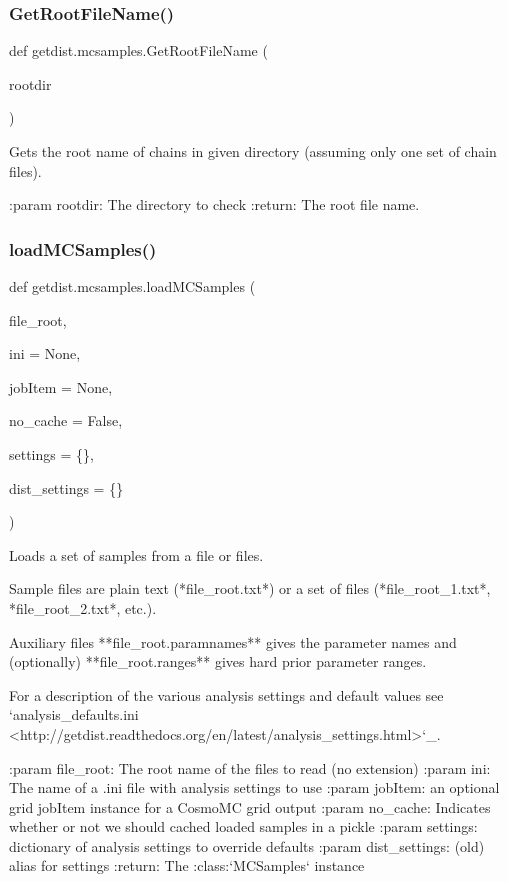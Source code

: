 \subsubsection{\texorpdfstring{Get\+Root\+File\+Name()}{GetRootFileName()}}
{\footnotesize\ttfamily def getdist.\+mcsamples.\+Get\+Root\+File\+Name (\begin{DoxyParamCaption}\item[{}]{rootdir }\end{DoxyParamCaption})}

\begin{DoxyVerb}Gets the root name of chains in given directory (assuming only one set of chain files).

:param rootdir: The directory to check
:return: The root file name.
\end{DoxyVerb}
 \mbox{\label{namespacegetdist_1_1mcsamples_a66a8bc2e3ca8236e828441cbf5db2cba}} 
\subsubsection{\texorpdfstring{load\+M\+C\+Samples()}{loadMCSamples()}}
{\footnotesize\ttfamily def getdist.\+mcsamples.\+load\+M\+C\+Samples (\begin{DoxyParamCaption}\item[{}]{file\+\_\+root,  }\item[{}]{ini = {\ttfamily None},  }\item[{}]{job\+Item = {\ttfamily None},  }\item[{}]{no\+\_\+cache = {\ttfamily False},  }\item[{}]{settings = {\ttfamily \{\}},  }\item[{}]{dist\+\_\+settings = {\ttfamily \{\}} }\end{DoxyParamCaption})}

\begin{DoxyVerb}Loads a set of samples from a file or files.

Sample files are plain text (*file_root.txt*) or a set of files (*file_root_1.txt*, *file_root_2.txt*, etc.).

Auxiliary files **file_root.paramnames** gives the parameter names
and (optionally) **file_root.ranges** gives hard prior parameter ranges.

For a description of the various analysis settings and default values see
`analysis_defaults.ini <http://getdist.readthedocs.org/en/latest/analysis_settings.html>`_.

:param file_root: The root name of the files to read (no extension)
:param ini: The name of a .ini file with analysis settings to use
:param jobItem: an optional grid jobItem instance for a CosmoMC grid output
:param no_cache: Indicates whether or not we should cached loaded samples in a pickle
:param settings: dictionary of analysis settings to override defaults
:param dist_settings: (old) alias for settings
:return: The :class:`MCSamples` instance
\end{DoxyVerb}
 

